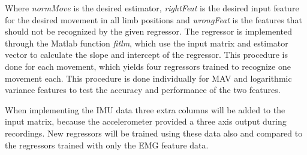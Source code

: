 Where \textit{normMove} is the desired estimator, \textit{rightFeat} is the desired input feature for the desired movement in all limb positions and \textit{wrongFeat} is the features that should not be recognized by the given regressor. The regressor is implemented through the Matlab function \textit{fitlm}, which use the input matrix and estimator vector to calculate the slope and intercept of the regressor.
This procedure is done for each movement, which yields four regressors trained to recognize one movement each. This procedure is done individually for MAV and logarithmic variance features to test the accuracy and performance of the two features. 


When implementing the IMU data three extra columns will be added to the input matrix, because the accelerometer provided a three axis output during recordings. New regressors will be trained using these data also and compared to the regressors trained with only the EMG feature data. 


